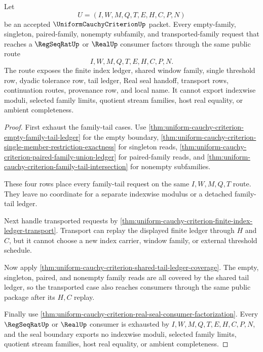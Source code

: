\begin{theorem}
\label{thm:uniform-cauchy-criterion-late-overlap-exhaustion}
Let
$$
U=(I,W,M,Q,T,E,H,C,P,N)
$$
be an accepted $\UniformCauchyCriterionUp$ packet. Every empty-family, singleton, paired-family, nonempty subfamily, and transported-family request that reaches a $\RegSeqRatUp$ or $\RealUp$ consumer factors through the same public route
$$
I,W,M,Q,T,E,H,C,P,N .
$$
The route exposes the finite index ledger, shared window family, single threshold row, dyadic tolerance row, tail ledger, Real seal handoff, transport rows, continuation routes, provenance row, and local name. It cannot export indexwise moduli, selected family limits, quotient stream families, host real equality, or ambient completeness.
\end{theorem}
\begin{proof}
First exhaust the family-tail cases. Use \autoref{thm:uniform-cauchy-criterion-empty-family-tail-ledger} for the empty boundary, \autoref{thm:uniform-cauchy-criterion-single-member-restriction-exactness} for singleton reads, \autoref{thm:uniform-cauchy-criterion-paired-family-union-ledger} for paired-family reads, and \autoref{thm:uniform-cauchy-criterion-family-tail-intersection} for nonempty subfamilies.

These four rows place every family-tail request on the same $I,W,M,Q,T$ route. They leave no coordinate for a separate indexwise modulus or a detached family-tail ledger.

Next handle transported requests by \autoref{thm:uniform-cauchy-criterion-finite-index-ledger-transport}. Transport can replay the displayed finite ledger through $H$ and $C$, but it cannot choose a new index carrier, window family, or external threshold schedule.

Now apply \autoref{thm:uniform-cauchy-criterion-shared-tail-ledger-coverage}. The empty, singleton, paired, and nonempty family reads are all covered by the shared tail ledger, so the transported case also reaches consumers through the same public package after its $H,C$ replay.

Finally use \autoref{thm:uniform-cauchy-criterion-real-seal-consumer-factorization}. Every $\RegSeqRatUp$ or $\RealUp$ consumer is exhausted by $I,W,M,Q,T,E,H,C,P,N$, and the seal boundary exports no indexwise moduli, selected family limits, quotient stream families, host real equality, or ambient completeness.
\end{proof}

